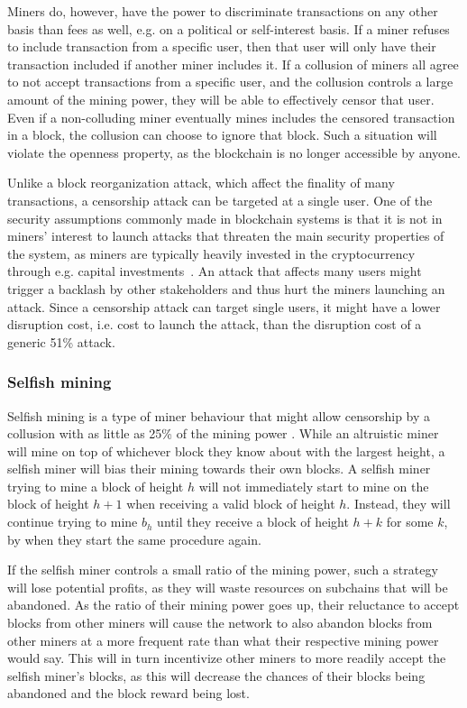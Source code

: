 Miners do, however, have the power to discriminate transactions on any other basis than fees as well, e.g. on a political or self-interest basis. If a miner refuses to include transaction from a specific user, then that user will only have their transaction included if another miner includes it. If a collusion of miners all agree to not accept transactions from a specific user, and the collusion controls a large amount of the mining power, they will be able to effectively censor that user. Even if a non-colluding miner eventually mines includes the censored transaction in a block, the collusion can choose to ignore that block. Such a situation will violate the openness property, as the blockchain is no longer accessible by anyone. 

Unlike a block reorganization attack, which affect the finality of many transactions, a censorship attack can be targeted at a single user. One of the security assumptions commonly made in blockchain systems is that it is not in miners' interest to launch attacks that threaten the main security properties of the system, as miners are typically heavily invested in the cryptocurrency through e.g. capital investments~\cite{buterin_problem_2015,wuille_security_2019}. An attack that affects many users might trigger a backlash by other stakeholders and thus hurt the miners launching an attack. Since a censorship attack can target single users, it might have a lower disruption cost, i.e. cost to launch the attack, than the disruption cost of a generic 51\% attack. 

\subsubsection{Selfish mining}
Selfish mining is a type of miner behaviour that might allow censorship by a collusion with as little as 25\% of the mining power \cite{eyal_majority_2018}. While an altruistic miner will mine on top of whichever block they know about with the largest height, a selfish miner will bias their mining towards their own blocks. A selfish miner trying to mine a block of height $h$ will not immediately start to mine on the block of height $h+1$ when receiving a valid block of height $h$. Instead, they will continue trying to mine $b_h$ until they receive a block of height $h+k$ for some $k$, by when they start the same procedure again.

If the selfish miner controls a small ratio of the mining power, such a strategy will lose potential profits, as they will waste resources on subchains that will be abandoned. As the ratio of their mining power goes up, their reluctance to accept blocks from other miners will cause the network to also abandon blocks from other miners at a more frequent rate than what their respective mining power would say. This will in turn incentivize other miners to more readily accept the selfish miner's blocks, as this will decrease the chances of their blocks being abandoned and the block reward being lost.

